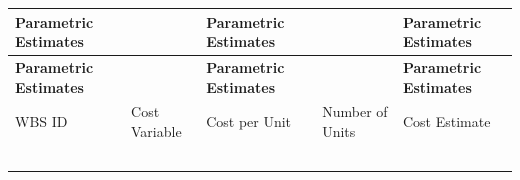 \documentclass[10pt,letterpaper]{article}
\renewcommand\arraystretch{1.25}
\begin{document}
\begin{center}
\begingroup
\setlength\tabcolsep{2.0pt}
\footnotesize
\renewcommand\arraystretch{1.55}
\begin{longtable}{|>{\raggedright\arraybackslash}p{1.220in}|>{\raggedright\arraybackslash}p{1.220in}|>{\raggedright\arraybackslash}p{1.220in}|>{\raggedright\arraybackslash}p{1.220in}|>{\raggedright\arraybackslash}p{1.220in}|}
\hline
\rowcolor{light}
\textbf{Parametric Estimates} & \rule{0pt}{11pt}\hspace{0pt} & \textbf{Parametric Estimates} & \rule{0pt}{11pt}\hspace{0pt} & \textbf{Parametric Estimates} \\ \hline
\endfirsthead
\hline\rowcolor{light} \textbf{Parametric Estimates} & \rule{0pt}{11pt}\hspace{0pt} & \textbf{Parametric Estimates} & \rule{0pt}{11pt}\hspace{0pt} & \textbf{Parametric Estimates} \\ \hline
\endhead
WBS ID & Cost Variable & Cost per Unit & Number of Units & Cost Estimate \\ \hline
\rule{0pt}{11pt}\hspace{0pt} & \rule{0pt}{11pt}\hspace{0pt} & \rule{0pt}{11pt}\hspace{0pt} & \rule{0pt}{11pt}\hspace{0pt} & \rule{0pt}{11pt}\hspace{0pt} \\ \hline
\rule{0pt}{11pt}\hspace{0pt} & \rule{0pt}{11pt}\hspace{0pt} & \rule{0pt}{11pt}\hspace{0pt} & \rule{0pt}{11pt}\hspace{0pt} & \rule{0pt}{11pt}\hspace{0pt} \\ \hline
\rule{0pt}{11pt}\hspace{0pt} & \rule{0pt}{11pt}\hspace{0pt} & \rule{0pt}{11pt}\hspace{0pt} & \rule{0pt}{11pt}\hspace{0pt} & \rule{0pt}{11pt}\hspace{0pt} \\ \hline
\rule{0pt}{11pt}\hspace{0pt} & \rule{0pt}{11pt}\hspace{0pt} & \rule{0pt}{11pt}\hspace{0pt} & \rule{0pt}{11pt}\hspace{0pt} & \rule{0pt}{11pt}\hspace{0pt} \\ \hline
\rule{0pt}{11pt}\hspace{0pt} & \rule{0pt}{11pt}\hspace{0pt} & \rule{0pt}{11pt}\hspace{0pt} & \rule{0pt}{11pt}\hspace{0pt} & \rule{0pt}{11pt}\hspace{0pt} \\ \hline
\end{longtable}
\endgroup
\end{center}
\end{document}
